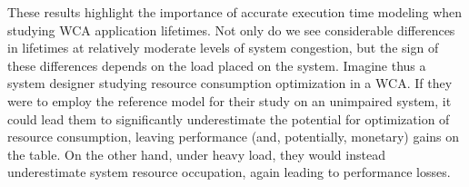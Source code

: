 These results highlight the importance of accurate execution time modeling when studying \ac{WCA} application lifetimes.
Not only do we see considerable differences in lifetimes at relatively moderate levels of system congestion, but the sign of these differences depends on the load placed on the system.
Imagine thus a system designer studying resource consumption optimization in a \ac{WCA}.
If they were to employ the reference model for their study on an unimpaired system, it could lead them to significantly underestimate the potential for optimization of resource consumption, leaving performance (and, potentially, monetary) gains on the table.
On the other hand, under heavy load, they would instead underestimate system resource occupation, again leading to performance losses.



